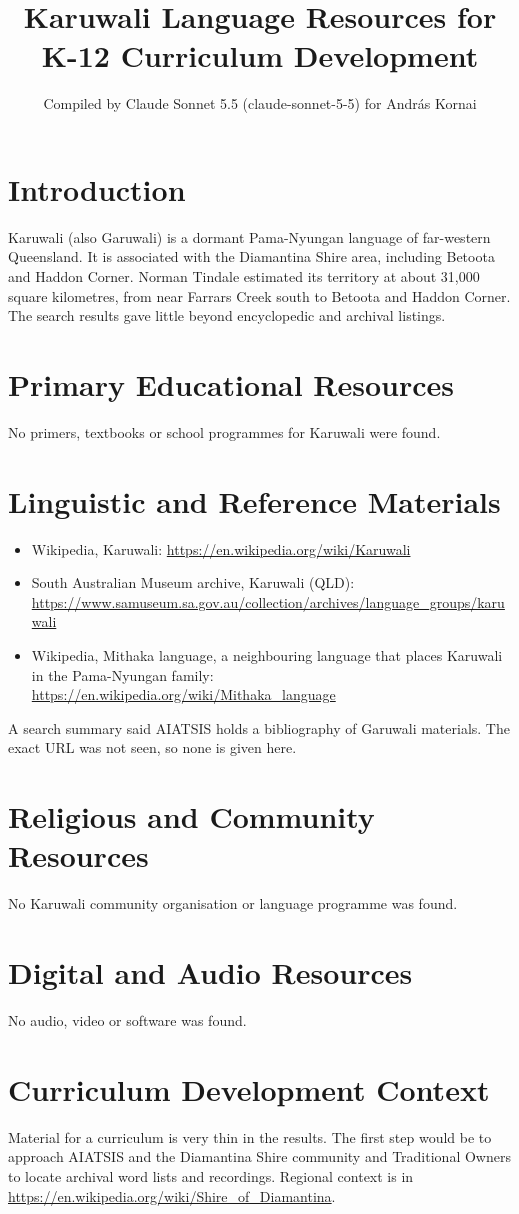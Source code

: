 \documentclass[12pt]{article}
\title{Karuwali Language Resources for K-12 Curriculum Development}
\author{Compiled by Claude Sonnet 5.5 (claude-sonnet-5-5) for Andr\'as Kornai}
\date{}
\begin{document}
\maketitle

\section{Introduction}
Karuwali (also Garuwali) is a dormant Pama-Nyungan language of far-western Queensland. It is associated with the Diamantina Shire area, including Betoota and Haddon Corner. Norman Tindale estimated its territory at about 31,000 square kilometres, from near Farrars Creek south to Betoota and Haddon Corner. The search results gave little beyond encyclopedic and archival listings.

\section{Primary Educational Resources}
No primers, textbooks or school programmes for Karuwali were found.

\section{Linguistic and Reference Materials}
\begin{itemize}
\item Wikipedia, Karuwali: \url{https://en.wikipedia.org/wiki/Karuwali}
\item South Australian Museum archive, Karuwali (QLD): \url{https://www.samuseum.sa.gov.au/collection/archives/language_groups/karuwali}
\item Wikipedia, Mithaka language, a neighbouring language that places Karuwali in the Pama-Nyungan family: \url{https://en.wikipedia.org/wiki/Mithaka_language}
\end{itemize}
A search summary said AIATSIS holds a bibliography of Garuwali materials. The exact URL was not seen, so none is given here.

\section{Religious and Community Resources}
No Karuwali community organisation or language programme was found.

\section{Digital and Audio Resources}
No audio, video or software was found.

\section{Curriculum Development Context}
Material for a curriculum is very thin in the results. The first step would be to approach AIATSIS and the Diamantina Shire community and Traditional Owners to locate archival word lists and recordings. Regional context is in \url{https://en.wikipedia.org/wiki/Shire_of_Diamantina}.
\end{document}
